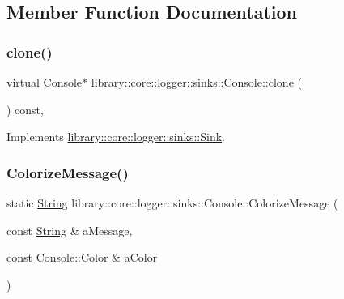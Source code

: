 \subsection{Member Function Documentation}
\mbox{\label{classlibrary_1_1core_1_1logger_1_1sinks_1_1_console_ac5c80193b0832f760a7447e7abc7d468}} 
\subsubsection{\texorpdfstring{clone()}{clone()}}
{\footnotesize\ttfamily virtual \hyperlink{classlibrary_1_1core_1_1logger_1_1sinks_1_1_console}{Console}$\ast$ library\+::core\+::logger\+::sinks\+::\+Console\+::clone (\begin{DoxyParamCaption}{ }\end{DoxyParamCaption}) const\hspace{0.3cm}{\ttfamily [override]}, {\ttfamily [virtual]}}



Implements \hyperlink{classlibrary_1_1core_1_1logger_1_1sinks_1_1_sink_a00ba941947d903825f4922694e0961dd}{library\+::core\+::logger\+::sinks\+::\+Sink}.

\mbox{\label{classlibrary_1_1core_1_1logger_1_1sinks_1_1_console_a9cf21ce963c2079b613bfb5788bb5659}} 
\subsubsection{\texorpdfstring{Colorize\+Message()}{ColorizeMessage()}}
{\footnotesize\ttfamily static \hyperlink{classlibrary_1_1core_1_1types_1_1_string}{String} library\+::core\+::logger\+::sinks\+::\+Console\+::\+Colorize\+Message (\begin{DoxyParamCaption}\item[{const \hyperlink{classlibrary_1_1core_1_1types_1_1_string}{String} \&}]{a\+Message,  }\item[{const \hyperlink{classlibrary_1_1core_1_1logger_1_1sinks_1_1_console_aa7a07d8165e1df74ad4d289d5220bc96}{Console\+::\+Color} \&}]{a\+Color }\end{DoxyParamCaption})\hspace{0.3cm}{\ttfamily [static]}}

